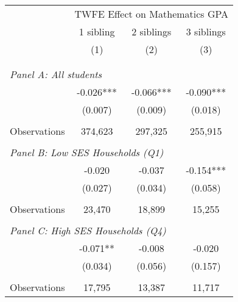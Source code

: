 \makeatletter
{}
{
\makeatother
\begin{tabular}{lccc}
\toprule
\cmidrule(lr){2-4}
& \multicolumn{3}{c}{TWFE Effect on Mathematics GPA} \\
\cmidrule(lr){2-4}
& 1 sibling & 2 siblings & 3 siblings  \\
\cmidrule(lr){2-2} \cmidrule(lr){3-3} \cmidrule(lr){4-4}
& (1) & (2) & (3)\\
\bottomrule
&  &  &  \\
&  &  &   \\
\multicolumn{4}{l}{\textit{Panel A: All students}} \\
\hspace{3mm}        &      -0.026***&      -0.066***&      -0.090***\\
                    &     (0.007)   &     (0.009)   &     (0.018)   \\
                    &               &               &               \\
\hspace{3mm}Observations&     374,623   &     297,325   &     255,915   \\
 
&  &  &   \\
\multicolumn{4}{l}{\textit{Panel B: Low SES Households (Q1)}} \\
\hspace{3mm}        &      -0.020   &      -0.037   &      -0.154***\\
                    &     (0.027)   &     (0.034)   &     (0.058)   \\
                    &               &               &               \\
\hspace{3mm}Observations&      23,470   &      18,899   &      15,255   \\
 
&  &  &   \\
\multicolumn{4}{l}{\textit{Panel C: High SES Households (Q4)}} \\
\hspace{3mm}        &      -0.071** &      -0.008   &      -0.020   \\
                    &     (0.034)   &     (0.056)   &     (0.157)   \\
                    &               &               &               \\
\hspace{3mm}Observations&      17,795   &      13,387   &      11,717   \\
 

\end{tabular}}
